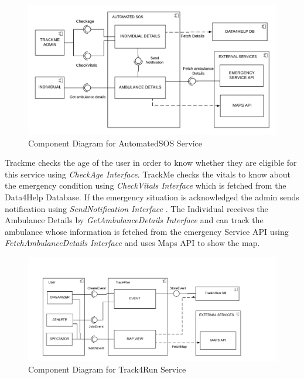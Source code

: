 \begin{figure}[H]
	\begin{center}
		\includegraphics[width=\textwidth]{./DD_Diagrams/ComponentAutomatedSOS.png}
      	\caption{Component Diagram for AutomatedSOS Service}
        \label{TrackMe_c2}
	\end{center}
\end{figure}
Trackme checks the age of the user in order to know whether they are eligible for this service using \textit{CheckAge Interface}. TrackMe checks the vitals to know about the emergency condition using \textit{CheckVitals Interface} which is fetched from the Data4Help Database.\newline 
If the emergency situation is acknowledged the admin sends notification using \textit{SendNotification Interface} .\newline
The Individual receives the Ambulance Details by \textit{GetAmbulanceDetails Interface} and can track the ambulance whose information is fetched from the emergency Service API using \textit{FetchAmbulanceDetails Interface} and uses Maps API to show the map.
\begin{figure}[H]
	\begin{center}
		\includegraphics[width=\textwidth]{./DD_Diagrams/ComponentTrack4Run.png}
      	\caption{Component Diagram for Track4Run Service}
        \label{TrackMe_c3}
	\end{center}
\end{figure}
